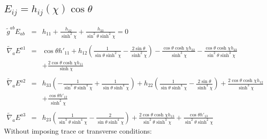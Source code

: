 \documentclass[10pt,letterpaper]{article}
\numberwithin{equation}{section}
\begin{document}
\subsection{$E_{ij} = h_{ij}(\chi)\cos\theta$}
\begin{eqnarray}
\tilde g^{ab}E_{ab}&=& h_{11} + \frac{h_{22}}{\sinh^2\chi} + \frac{h_{33}}{\sin^2\theta \sinh^2\chi} =0
\\ \nonumber\\
\tilde\nabla_a E^{a 1}&=& \cos\theta h'_{11} + h_{12} \left(\frac{1}{\sin\theta \sinh^2\chi} -  \frac{2 \sin\theta}{\sinh^2\chi}\right) -  \frac{\cos\theta \cosh\chi h_{22}}{\sinh^3\chi} -  \frac{\cos\theta \cosh\chi h_{33}}{\sin^2\theta \sinh^3\chi} \nonumber \\ 
&& + \frac{2 \cos\theta \cosh\chi h_{11}}{\sinh\chi}
\\  \nonumber\\ 
\tilde\nabla_a E^{a 2}&=& h_{33} \left(- \frac{1}{\sin^3\theta \sinh^4\chi} + \frac{1}{\sin\theta \sinh^4\chi}\right) + h_{22} \left(\frac{1}{\sin\theta \sinh^4\chi} -  \frac{2 \sin\theta}{\sinh^4\chi}\right) + \frac{2 \cos\theta \cosh\chi h_{12}}{\sinh^3\chi} \nonumber \\ 
&& + \frac{\cos\theta h'_{12}}{\sinh^2\chi}
\\  \nonumber\\ 
\tilde\nabla_a E^{a 3}&=& h_{23} \left(\frac{1}{\sin^3\theta \sinh^4\chi} -  \frac{2}{\sin\theta \sinh^4\chi}\right) + \frac{2 \cos\theta \cosh\chi h_{13}}{\sin^2\theta \sinh^3\chi} + \frac{\cos\theta h'_{13}}{\sin^2\theta \sinh^2\chi}
\end{eqnarray}
Without imposing trace or transverse conditions:
\end{document}
